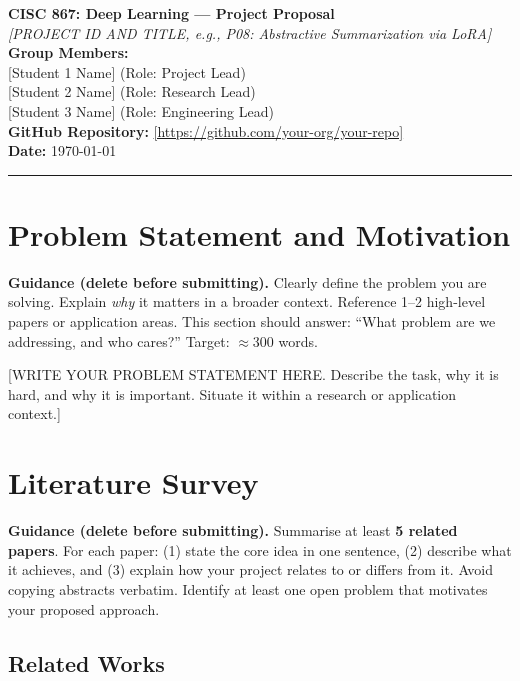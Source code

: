 \documentclass[11pt, letterpaper]{article}
\begin{document}
{\centering
  {\Large\textbf{CISC 867: Deep Learning --- Project Proposal}}\\[0.5em]
  {\large\textit{[PROJECT ID AND TITLE, e.g., P08: Abstractive Summarization via LoRA]}}\\[0.4em]
  \textbf{Group Members:}\\{}
  [Student 1 Name] \quad [Student ID] \quad (Role: Project Lead)\\{}
  [Student 2 Name] \quad [Student ID] \quad (Role: Research Lead)\\{}
  [Student 3 Name] \quad [Student ID] \quad (Role: Engineering Lead)\\[0.3em]
  \textbf{GitHub Repository:} \url{[https://github.com/your-org/your-repo]}\\[0.3em]
  \textbf{Date:} \today\\[0.4em]
  \rule{\linewidth}{0.4pt}
}

\section{Problem Statement and Motivation}

\begin{guidancebox}
\textbf{Guidance (delete before submitting).}
Clearly define the problem you are solving. Explain \emph{why} it matters
in a broader context. Reference 1--2 high-level papers or application areas.
This section should answer: ``What problem are we addressing, and who cares?''
Target: $\approx$300 words.
\end{guidancebox}

[WRITE YOUR PROBLEM STATEMENT HERE. Describe the task, why it is hard, and why
it is important. Situate it within a research or application context.]

\section{Literature Survey}

\begin{guidancebox}
\textbf{Guidance (delete before submitting).}
Summarise at least \textbf{5 related papers}. For each paper:
(1) state the core idea in one sentence, (2) describe what it achieves,
and (3) explain how your project relates to or differs from it.
Avoid copying abstracts verbatim. Identify at least one open problem
that motivates your proposed approach.
\end{guidancebox}

\subsection{Related Works}
\end{document}
